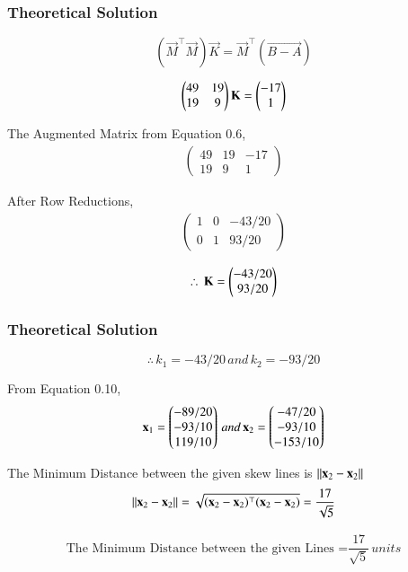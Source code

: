 \documentclass{beamer}
\begin{document}
\begin{frame}[fragile]
\frametitle{Theoretical Solution}
\begin{equation}
    (\vec{M}^\top\vec{M})\vec{K}=\vec{M}^\top(\vec{B-A})
\end{equation}

\begin{equation}
    \begin{pmatrix}49 & 19 \\ 19 & 9\end{pmatrix}\mathbf{K} = \begin{pmatrix}-17 \\ 1\end{pmatrix}
\end{equation}

The Augmented Matrix from Equation 0.6,\\
\begin{align}
\left(
\begin{array}{cc|c}
         49 & 19 & -17 \\
         19 & 9 & 1
\end{array}
\right)
\end{align}

After Row Reductions,
\begin{align}
\left(
\begin{array}{cc|c}
         1 & 0 & -43/20 \\
         0 & 1 & 93/20
\end{array}
\right)
\end{align}

\begin{equation}
    \therefore \, \mathbf{K} = \begin{pmatrix}-43/20 \\ 93/20\end{pmatrix}
\end{equation}
\end{frame}

\begin{frame}[fragile]
\frametitle{Theoretical Solution}
\begin{equation}
\therefore \, k_1 = -43/20 \, and \, k_2 = -93/20    
\end{equation}

From Equation 0.10,
\begin{align}
    \mathbf{x}_1 = \begin{pmatrix}-89/20 \\ -93/10 \\ 119/10\end{pmatrix} \, and \, \mathbf{x}_2 =\begin{pmatrix}-47/20 \\ -93/10 \\ -153/10\end{pmatrix}
\end{align}

The Minimum Distance between the given skew lines is $\left\lVert\mathbf{x}_2 - \mathbf{x}_2\right\rVert$
\begin{equation}
    \left\lVert\mathbf{x}_2 - \mathbf{x}_2\right\rVert = \sqrt{(\mathbf{x}_2 - \mathbf{x}_2)^\top (\mathbf{x}_2 - \mathbf{x}_2)} = \dfrac{17}{\sqrt{5}}
\end{equation}

\begin{align}
    \boxed{\text{The Minimum Distance between the given Lines =} \dfrac{17}{\sqrt{5}} \, units}
\end{align}
\end{frame}
\end{document}
